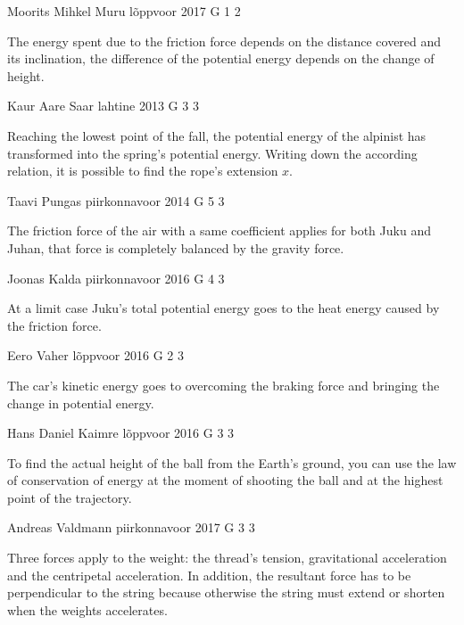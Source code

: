 \documentclass[11pt]{article}
\begin{document}
{Moorits Mihkel Muru} %
{lõppvoor} %
{2017} %
{G 1} %
{2} %
{

\ifEngHint
The energy spent due to the friction force depends on the distance covered and its inclination, the difference of the potential energy depends on the change of height.
\fi
}

{Kaur Aare Saar} %
{lahtine} %
{2013} %
{G 3} %
{3} %
{

\ifEngHint
Reaching the lowest point of the fall, the potential energy of the alpinist has transformed into the spring’s potential energy. Writing down the according relation, it is possible to find the rope’s extension $x$.
\fi
}

{Taavi Pungas} %
{piirkonnavoor} %
{2014} %
{G 5} %
{3} %
{

\ifEngHint
The friction force of the air with a same coefficient applies for both Juku and Juhan, that force is completely balanced by the gravity force.
\fi
}

{Joonas Kalda} %
{piirkonnavoor} %
{2016} %
{G 4} %
{3} %
{

\ifEngHint
At a limit case Juku’s total potential energy goes to the heat energy caused by the friction force.
\fi
}

{Eero Vaher} %
{lõppvoor} %
{2016} %
{G 2} %
{3} %
{

\ifEngHint
The car’s kinetic energy goes to overcoming the braking force and bringing the change in potential energy.
\fi
}

{Hans Daniel Kaimre} %
{lõppvoor} %
{2016} %
{G 3} %
{3} %
{

\ifEngHint
To find the actual height of the ball from the Earth’s ground, you can use the law of conservation of energy at the moment of shooting the ball and at the highest point of the trajectory.
\fi
}

{Andreas Valdmann} %
{piirkonnavoor} %
{2017} %
{G 3} %
{3} %
{

\ifEngHint
Three forces apply to the weight: the thread’s tension, gravitational acceleration and the centripetal acceleration. In addition, the resultant force has to be perpendicular to the string because otherwise the string must extend or shorten when the weights accelerates.
\fi
}
\end{document}
